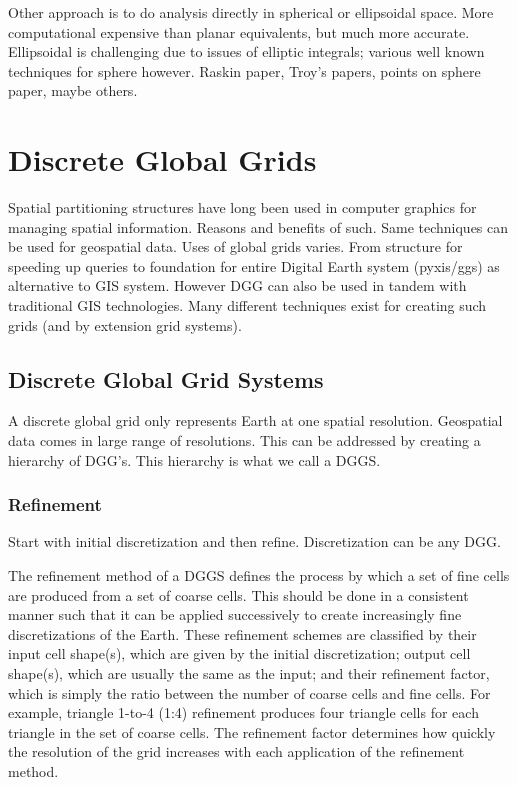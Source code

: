 Other approach is to do analysis directly in spherical or ellipsoidal space.
More computational expensive than planar equivalents, but much more accurate.
Ellipsoidal is challenging due to issues of elliptic integrals; various well known techniques for sphere however.
Raskin paper, Troy's papers, points on sphere paper, maybe others.
\cite{raskin1994spatial}
\cite{bahrdt2017rational}
\cite{alderson2016multiresolution}
\cite{alderson2019multiscale}
\cite{alderson2018offsetting}


\section{Discrete Global Grids}
Spatial partitioning structures have long been used in computer graphics for managing spatial information.
Reasons and benefits of such.
Same techniques can be used for geospatial data.
Uses of global grids varies.
From structure for speeding up queries to foundation for entire Digital Earth system (pyxis/ggs) as alternative to GIS system.
However DGG can also be used in tandem with traditional GIS technologies.
Many different techniques exist for creating such grids (and by extension grid systems).
\cite{sahr1998discrete}
\cite{sahr2003geodesic}


\subsection{Discrete Global Grid Systems}
A discrete global grid only represents Earth at one spatial resolution.
Geospatial data comes in large range of resolutions.
This can be addressed by creating a hierarchy of DGG's.
This hierarchy is what we call a DGGS.


\subsubsection{Refinement}
Start with initial discretization and then refine.
Discretization can be any DGG.


The refinement method of a DGGS defines the process by which a set of fine cells are produced from a set of coarse cells.
This should be done in a consistent manner such that it can be applied successively to create increasingly fine discretizations of the Earth.
These refinement schemes are classified by their input cell shape(s), which are given by the initial discretization; output cell shape(s), which are usually the same as the input; and their refinement factor, which is simply the ratio between the number of coarse cells and fine cells.
For example, triangle 1-to-4 (1:4) refinement produces four triangle cells for each triangle in the set of coarse cells.
The refinement factor determines how quickly the resolution of the grid increases with each application of the refinement method.


